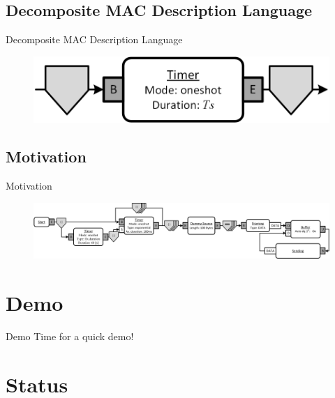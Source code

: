 \documentclass{beamer}
\begin{document}
\subsection{Decomposite MAC Description Language}
\begin{frame}{Decomposite MAC Description Language}
	\begin{figure}
 		\includegraphics[width=\linewidth]{simple_timer.png}
 		\label{fig:timer}
	\end{figure}
\end{frame}

\subsection{Motivation}
\begin{frame}{Motivation}
	\begin{figure}
 		\includegraphics[width=\linewidth]{pure_aloha.png}
 		\label{fig:aloha}
	\end{figure}
\end{frame}

\section{Demo}
\begin{frame}{Demo}
Time for a quick demo!
\end{frame}

\section{Status}
\end{document}
